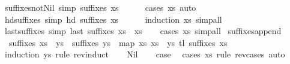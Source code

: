 \begin{isabellebody}
\endisatagproof
{\isafoldproof}%
%
\isadelimproof
\isanewline
%
\endisadelimproof
\isanewline
{}\isamarkupfalse%
\ suffixes{\isacharunderscore}not{\isacharunderscore}Nil\ {\isacharbrackleft}simp{\isacharbrackright}{\isacharcolon}\ {\isachardoublequoteopen}suffixes\ xs\ {\isasymnoteq}\ {\isacharbrackleft}{\isacharbrackright}{\isachardoublequoteclose}\isanewline
%
\isadelimproof
\ \ %
\endisadelimproof
%
\isatagproof
{}\isamarkupfalse%
\ {\isacharparenleft}cases\ xs{\isacharparenright}\ auto%
\endisatagproof
{\isafoldproof}%
%
\isadelimproof
\isanewline
%
\endisadelimproof
\isanewline
{}\isamarkupfalse%
\ hd{\isacharunderscore}suffixes\ {\isacharbrackleft}simp{\isacharbrackright}{\isacharcolon}\ {\isachardoublequoteopen}hd\ {\isacharparenleft}suffixes\ xs{\isacharparenright}\ {\isacharequal}\ {\isacharbrackleft}{\isacharbrackright}{\isachardoublequoteclose}\isanewline
%
\isadelimproof
\ \ %
\endisadelimproof
%
\isatagproof
{}\isamarkupfalse%
\ {\isacharparenleft}induction\ xs{\isacharparenright}\ simp{\isacharunderscore}all%
\endisatagproof
{\isafoldproof}%
%
\isadelimproof
\isanewline
%
\endisadelimproof
\isanewline
{}\isamarkupfalse%
\ last{\isacharunderscore}suffixes\ {\isacharbrackleft}simp{\isacharbrackright}{\isacharcolon}\ {\isachardoublequoteopen}last\ {\isacharparenleft}suffixes\ xs{\isacharparenright}\ {\isacharequal}\ xs{\isachardoublequoteclose}\isanewline
%
\isadelimproof
\ \ %
\endisadelimproof
%
\isatagproof
{}\isamarkupfalse%
\ {\isacharparenleft}cases\ xs{\isacharparenright}\ simp{\isacharunderscore}all%
\endisatagproof
{\isafoldproof}%
%
\isadelimproof
\isanewline
%
\endisadelimproof
\isanewline
{}\isamarkupfalse%
\ suffixes{\isacharunderscore}append{\isacharcolon}\ \isanewline
\ \ {\isachardoublequoteopen}suffixes\ {\isacharparenleft}xs\ {\isacharat}\ ys{\isacharparenright}\ {\isacharequal}\ suffixes\ ys\ {\isacharat}\ map\ {\isacharparenleft}{\isasymlambda}xs{\isacharprime}{\isachardot}\ xs{\isacharprime}\ {\isacharat}\ ys{\isacharparenright}\ {\isacharparenleft}tl\ {\isacharparenleft}suffixes\ xs{\isacharparenright}{\isacharparenright}{\isachardoublequoteclose}\isanewline
%
\isadelimproof
%
\endisadelimproof
%
\isatagproof
{}\isamarkupfalse%
\ {\isacharparenleft}induction\ ys\ rule{\isacharcolon}\ rev{\isacharunderscore}induct{\isacharparenright}\isanewline
\ \ \isamarkupfalse%
\ Nil\isanewline
\ \ \isamarkupfalse%
\ {\isacharquery}case\ \isamarkupfalse%
\ {\isacharparenleft}cases\ xs\ rule{\isacharcolon}\ rev{\isacharunderscore}cases{\isacharparenright}\ auto\isanewline

\end{isabellebody}
